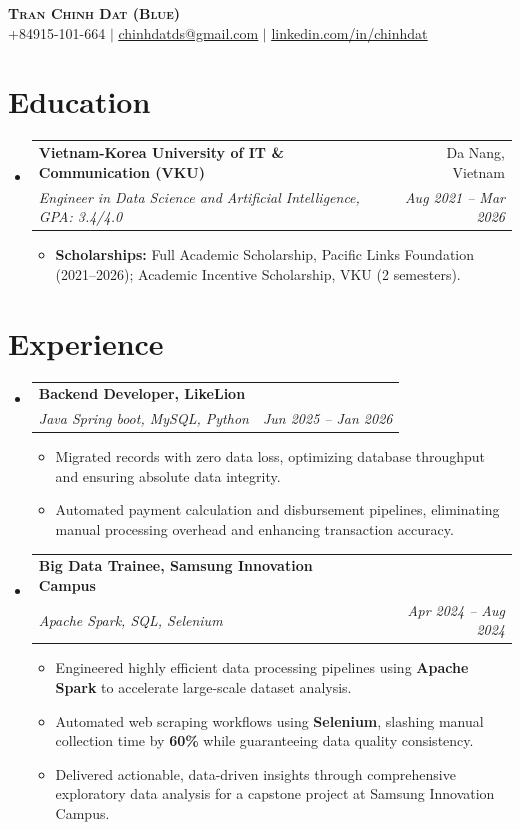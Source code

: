\documentclass[a4paper,11pt]{article}
\makeatletter
\newcommand{\resumeItem}[1]{
  \item\small{
    {#1 \vspace{-3pt}}
  }
}
\newcommand{\resumeSubheading}[4]{
  \vspace{-3pt}\item
    \begin{tabular*}{\textwidth}[t]{l@{\extracolsep{\fill}}r}
      \textbf{#1} & #2 \\
      \textit{\small#3} & \textit{\small #4} \\
    \end{tabular*}\vspace{-8pt}
}
\newcommand{\resumeSubHeadingListStart}{\begin{itemize}[leftmargin=0.12in, label={}, itemsep=0pt]}
\newcommand{\resumeSubHeadingListEnd}{\end{itemize}}
\newcommand{\resumeItemListStart}{\begin{itemize}[leftmargin=0.18in, itemsep=0pt]}
\newcommand{\resumeItemListEnd}{\end{itemize}\vspace{-6pt}}
\makeatother
\begin{document}
\begin{center}
    \textbf{\LARGE \scshape Tran Chinh Dat (Blue)} \\ \vspace{2pt}
    \small +84915-101-664 $|$ \href{mailto:chinhdatds@gmail.com}{\underline{chinhdatds@gmail.com}} $|$ 
    \href{https://linkedin.com/in/chinhdat}{\underline{linkedin.com/in/chinhdat}} \\ \vspace{2pt}
\end{center}

\section{Education}
  \resumeSubHeadingListStart
    \resumeSubheading
      {Vietnam-Korea University of IT \& Communication (VKU)}{Da Nang, Vietnam}
      {Engineer in Data Science and Artificial Intelligence, GPA: 3.4/4.0}{Aug 2021 -- Mar 2026}
      \resumeItemListStart
        \resumeItem{\textbf{Scholarships:} Full Academic Scholarship, Pacific Links Foundation (2021--2026); Academic Incentive Scholarship, VKU (2 semesters).}
      \resumeItemListEnd
  \resumeSubHeadingListEnd

\section{Experience}
  \resumeSubHeadingListStart
    \resumeSubheading
      {Backend Developer, LikeLion}{}
      {Java Spring boot, MySQL, Python}{Jun 2025 -- Jan 2026}
      \resumeItemListStart
        \resumeItem{Migrated records with zero data loss, optimizing database throughput and ensuring absolute data integrity.}
        \resumeItem{Automated payment calculation and disbursement pipelines, eliminating manual processing overhead and enhancing transaction accuracy.}
      \resumeItemListEnd
    \resumeSubheading
      {Big Data Trainee, Samsung Innovation Campus}{}
      {Apache Spark, SQL, Selenium}{Apr 2024 -- Aug 2024}
      \resumeItemListStart
        \resumeItem{Engineered highly efficient data processing pipelines using \textbf{Apache Spark} to accelerate large-scale dataset analysis.}
        \resumeItem{Automated web scraping workflows using \textbf{Selenium}, slashing manual collection time by \textbf{60\%} while guaranteeing data quality consistency.}
        \resumeItem{Delivered actionable, data-driven insights through comprehensive exploratory data analysis for a capstone project at Samsung Innovation Campus.}
      \resumeItemListEnd
  \resumeSubHeadingListEnd
\end{document}
